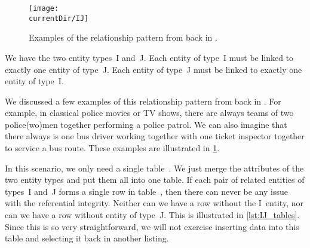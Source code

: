 %
%
\label{sec:rm:ij}%
%
\begin{figure}%
\centering%
\texttt{[image: \\currentDir/IJ]}%
\caption{Examples of the  relationship pattern from back in .}%
\label{fig:rm:ij}%
\end{figure}%
%
%
%
%
We have the two entity types~I and~J.
Each entity of type~I must be linked to exactly one entity of type~J.
Each entity of type~J must be linked to exactly one entity of type~I.

We discussed a few examples of this relationship pattern from back in .
For example, in classical police movies or TV shows, there are always teams of two police(wo)men together performing a police patrol.
We can also imagine that there always is one bus driver working together with one ticket inspector together to service a bus route.
These examples are illustrated in \cref{fig:rm:ij}.

In this scenario, we only need a single table~\cite{S2024D:MEDTRDM}.
We just merge the attributes of the two entity types and put them all into one table.
If each pair of related entities of types~I and~J forms a single row in table~, then there can never be any issue with the referential integrity.
Neither can we have a row without the I~entity, nor can we have a row without entity of type~J.
This is illustrated in \cref{lst:IJ_tables}.
Since this is so very straightforward, we will not exercise inserting data into this table and selecting it back in another listing.%
%
\FloatBarrier%
\endhsection%
%

